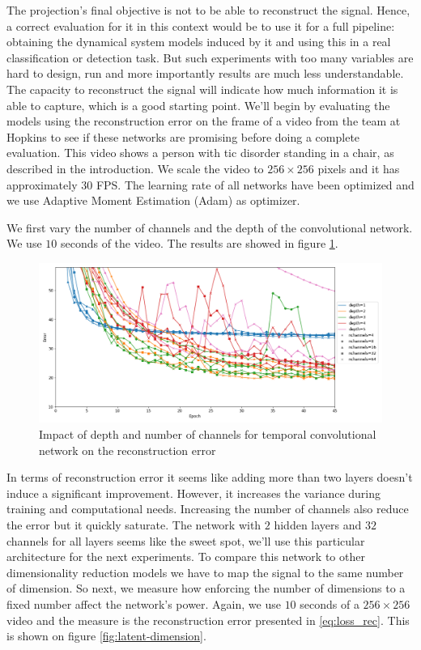 \documentclass[twocolumn,10pt]{asme2ej}
\begin{document}
The projection's final objective is not to be able to reconstruct the signal. Hence, a correct evaluation for it in this context would be to use it for a full pipeline: obtaining the dynamical system models induced by it and using this in a real classification or detection task. But such experiments with too many variables are hard to design, run and more importantly results are much less understandable. The capacity to reconstruct the signal will indicate how much information it is able to capture, which is a good starting point. We'll begin by evaluating the models using the reconstruction error on the frame of a video from the team at Hopkins to see if these networks are promising before doing a complete evaluation. This video shows a person with tic disorder standing in a chair, as described in the introduction. We scale the video to $256\times 256$ pixels and it has approximately $30$ FPS. The learning rate of all networks have been optimized and we use Adaptive Moment Estimation (Adam) as optimizer.

We first vary the number of channels and the depth of the convolutional network. We use $10$ seconds of the video. The results are showed in figure \ref{fig:tempconv-channels}.

\begin{figure}[ht]
    \centering
    \includegraphics[width=0.7\paperwidth]{reconstruction_error_comparison_tempconv_channels_depth_wrt_epoch.png}
    \caption{Impact of depth and number of channels for temporal convolutional network on the reconstruction error}
    \label{fig:tempconv-channels}
\end{figure}

In terms of reconstruction error it seems like adding more than two layers doesn't induce a significant improvement. However, it increases the variance during training and computational needs. Increasing the number of channels also reduce the error but it quickly saturate. The network with $2$ hidden layers and $32$ channels for all layers seems like the sweet spot, we'll use this particular architecture for the next experiments. To compare this network to other dimensionality reduction models we have to map the signal to the same number of dimension. So next, we measure how enforcing the number of dimensions to a fixed number affect the network's power. Again, we use $10$ seconds of a $256\times 256$ video and the measure is the reconstruction error presented in \eqref{eq:loss_rec}. This is shown on figure \ref{fig:latent-dimension}.
\end{document}
